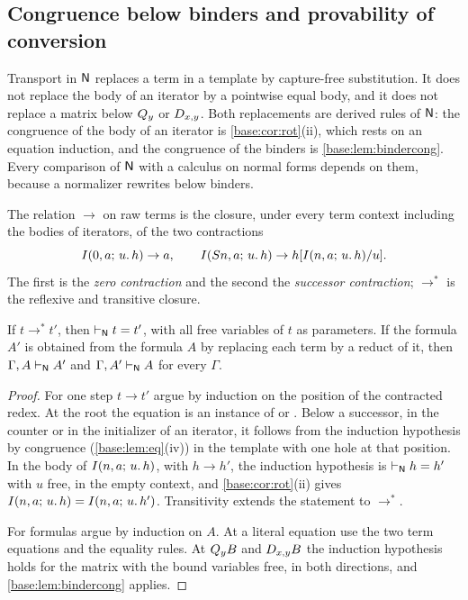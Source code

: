 \subsection{Congruence below binders and provability of conversion}
\label{comp:sec:conversion}

Transport in $\mathsf{N}$ replaces a term in a template by capture-free
substitution. It does not replace the body of an iterator by a pointwise
equal body, and it does not replace a matrix below $Q_{y}$ or $D_{x,y}$.
Both replacements are derived rules of $\mathsf{N}$: the congruence of the body
of an iterator is \cref{base:cor:rot}(ii), which rests on an equation
induction, and the congruence of the binders is
\cref{base:lem:bindercong}. Every comparison of $\mathsf{N}$ with a calculus on
normal forms depends on them, because a normalizer rewrites below binders.

\begin{definition}
\label{comp:def:reduction}
The relation $\to$ on raw terms is the closure, under every term context
including the bodies of iterators, of the two contractions
\[
 I(0,a;\,u.\,h)\to a,\qquad
 I(S n,a;\,u.\,h)\to h[I(n,a;\,u.\,h)/u].
\]
The first is the \emph{zero contraction} and the second the \emph{successor
contraction}; $\to^{*}$ is the reflexive and transitive closure.
\end{definition}

\begin{lemma}
\label{comp:lem:conversion}
If $t\to^{*}t'$, then $\vdash_{\mathsf{N}}t=t'$, with all free variables of $t$
as parameters. If the formula $A'$ is obtained from the formula $A$ by
replacing each term by a reduct of it, then $\Gamma,A\vdash_{\mathsf{N}}A'$ and
$\Gamma,A'\vdash_{\mathsf{N}}A$ for every $\Gamma$.
\end{lemma}

\begin{proof}
For one step $t\to t'$ argue by induction on the position of the contracted
redex. At the root the equation is an instance of  or
. Below a successor, in the counter or in the initializer of an
iterator, it follows from the induction hypothesis by congruence
(\cref{base:lem:eq}(iv)) in the template with one hole at that position. In
the body of
$I(n,a;\,u.\,h)$, with $h\to h'$, the induction hypothesis is
$\vdash_{\mathsf{N}}h=h'$ with $u$ free, in the empty context, and
\cref{base:cor:rot}(ii) gives $I(n,a;\,u.\,h)=I(n,a;\,u.\,h')$.
Transitivity extends the statement to $\to^{*}$.

For formulas argue by induction on $A$. At a literal equation use the two
term equations and the equality rules. At $Q_{y}B$ and $D_{x,y}B$ the
induction hypothesis holds for the matrix with the bound variables free, in
both directions, and \cref{base:lem:bindercong} applies.
\end{proof}

